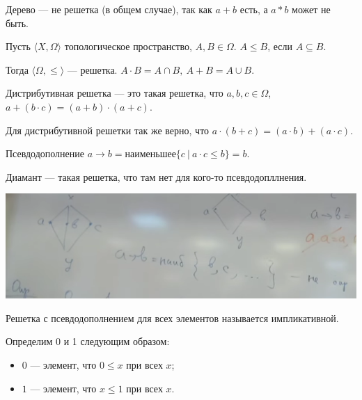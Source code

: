 \begin{example}
    Дерево --- не решетка (в общем случае), так как $a + b$ есть, а $a*b$ может не быть.
\end{example}

\begin{theorem}
    Пусть $\langle X, \Omega \rangle$ топологическое пространство, $A, B \in \Omega$. $A \leqslant B$, если $A \subseteq B$.

    Тогда $\langle \Omega, \leqslant\rangle$ --- решетка. $A \cdot B = A \cap B, ~ A + B = A \cup B$.
\end{theorem}

\begin{definition}
    Дистрибутивная решетка --- это такая решетка, что $a,b,c \in \Omega$, ~$a + (b \cdot c) = (a + b) \cdot (a + c)$.
\end{definition}

\begin{lemma}
    Для дистрибутивной решетки так же верно, что $a \cdot (b + c) = (a \cdot b) + (a \cdot c)$.
\end{lemma}

\begin{definition}
    Псевдодополнение $a \to b = \text{наименьшее} \{ c ~|~ a \cdot c \leqslant b\} = b$.
\end{definition}

\begin{definition}
    Диамант --- такая решетка, что там нет для кого-то псевдодопллнения.

    \begin{center}
        \includegraphics[scale=0.8]{img/topology_diomant}
    \end{center}
\end{definition}

\begin{definition}
    Решетка с псевдодополнением для всех элементов называется импликативной.
\end{definition}

\begin{definition} Определим 0 и 1 следующим образом:
    \begin{itemize}
        \item $0$ --- элемент, что $0 \leqslant x $ при всех $x$;
        \item $1$ --- элемент, что $x \leqslant 1 $ при всех $x$.
    \end{itemize}
\end{definition}

